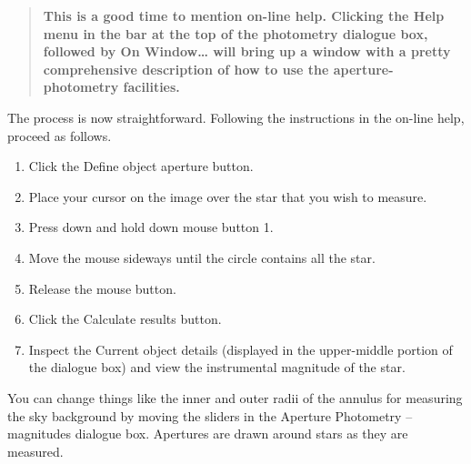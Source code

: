 \documentclass[twoside,11pt,nolof]{starlink}
\begin{document}
\begin{enumerate}
  \begin{quote}
   \textbf{This is a good time to mention on-line help.  Clicking the
   \textsf{Help} menu in the bar at the top of the photometry dialogue box,
   followed by \textsf{On Window\ldots} will bring up a window with a pretty
   comprehensive description of how to use the aperture-photometry
   facilities.}
  \end{quote}

   The process is now straightforward. Following the instructions in the
   on-line help, proceed as follows.

  \begin{enumerate}

     \item Click the \textsf{Define object aperture} button.

     \item Place your cursor on the image over the star that you wish
      to measure.

     \item Press down and hold down mouse button 1.

     \item Move the mouse sideways until the circle contains all the star.

     \item Release the mouse button.

     \item Click the \textsf{Calculate results} button.

     \item Inspect the \textsf{Current object details} (displayed in the
      upper-middle portion of the dialogue box) and view the instrumental
      magnitude of the star.

  \end{enumerate}

   You can change things like the inner and outer radii of the annulus for
   measuring the sky background by moving the sliders in the \textsf{Aperture
   Photometry -- magnitudes} dialogue box.  Apertures are drawn around
   stars as they are measured.


\end{enumerate}
\end{document}
